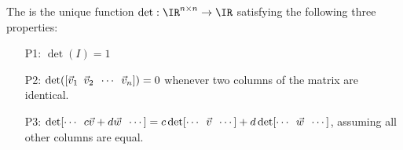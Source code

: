 \begin{applicationActivities}
\begin{definition}
The  is the unique function
\(\det:\IR^{n\times n}\to\IR\) satisfying the following three properties:
\begin{enumerate}
\item [P1:] $\det(I)=1$
\item [P2:] $\det([\vec{v}_1\hspace{0.5em}\vec{v}_2\hspace{0.5em}
\cdots\hspace{0.5em}\vec{v}_n])=0$ whenever two columns of the matrix are identical.
\item[P3:]
\(\det[\cdots\hspace{0.5em}c\vec{v}+d\vec{w}\hspace{0.5em}\cdots]=
c\det[\cdots\hspace{0.5em}\vec{v}\hspace{0.5em}\cdots]+
d\det[\cdots\hspace{0.5em}\vec{w}\hspace{0.5em}\cdots]\), assuming
all other columns are equal.
\end{enumerate}
\end{definition}

%


\end{applicationActivities}

